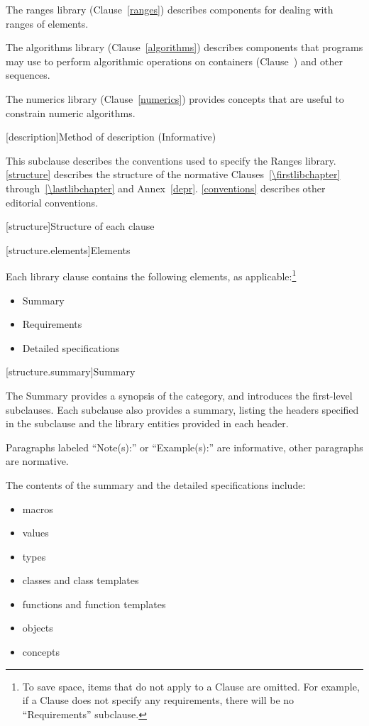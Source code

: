 \pnum
The ranges library (Clause~\ref{ranges}) describes components for dealing with
ranges of elements.

\pnum
The algorithms library (Clause~\ref{algorithms}) describes components that \Cpp
programs may use to perform algorithmic operations on containers
(Clause~) and other sequences.

\pnum
The numerics library (Clause~\ref{numerics}) provides concepts that are useful
to constrain numeric algorithms.

[description]{Method of description (Informative)}

\pnum
This subclause describes the conventions used to specify the Ranges
library. \ref{structure} describes the structure of the normative
Clauses~\ref{\firstlibchapter} through~\ref{\lastlibchapter} and
Annex~\ref{depr}. \ref{conventions} describes other editorial conventions.

[structure]{Structure of each clause}

[structure.elements]{Elements}

\pnum
Each library clause contains the following elements, as applicable:\footnote{To
save space, items that do not apply to a Clause are omitted.
For example, if a Clause does not specify any requirements,
there will be no ``Requirements'' subclause.}

\begin{itemize}
\item Summary
\item Requirements
\item Detailed specifications
\end{itemize}

[structure.summary]{Summary}

\pnum
The Summary provides a synopsis of the category, and introduces the first-level subclauses.
Each subclause also provides a summary, listing the headers specified in the
subclause and the library entities provided in each header.

\pnum
Paragraphs labeled ``Note(s):'' or ``Example(s):'' are informative, other paragraphs
are normative.

\pnum
The contents of the summary and the detailed specifications include:

\begin{itemize}
\item macros
\item values
\item types
\item classes and class templates
\item functions and function templates
\item objects
\item concepts
\end{itemize}


